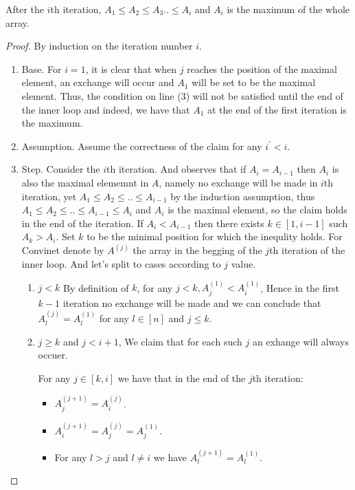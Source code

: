 \begin{claim}
  After the $i$th iteration, $A_{1} \le A_{2} \le A_{3} .. \le A_{i}$ and $A_{i}$ is the maximum of the whole array. 
\end{claim}
\begin{proof}
  By induction on the iteration number $i$. 
  \begin{enumerate}
    \item Base. For $i=1$, it is clear that when $j$ reaches the position of the maximal element, an exchange will occur and $A_{1}$ will be set to be the maximal element. Thus, the condition on line (3) will not be satisfied until the end of the inner loop and indeed, we have that $A_{1}$ at the end of the first iteration is the maximum.
    \item Assumption. Assume the correctness of the claim for any $i^{\prime} < i$. 
    \item Step. Consider the $i$th iteration. And observes that if $A_{i} = A_{i-1}$ then $A_{i}$ is also the maximal elememnt in $A$, namely no exchange will be made in $i$th iteration, yet $A_{1} \le A_{2} \le .. \le A_{i-1}$ by the induction assumption, thus  $A_{1} \le A_{2} \le .. \le A_{i-1} \le A_{i}$ and $A_{i}$ is the maximal element, so the claim holds in the end of the iteration. 
      If $A_{i} < A_{i-1}$ then there exists $k \in [1,i-1]$ such $A_{k} > A_{i}$. Set $k$ to be the minimal position for which the inequlity holds. For Convinet denote by $A^{(j)}$ the array in the begging of the $j$th iteration of the inner loop. And let's split to cases according to $j$ value. 
      \begin{enumerate}
        \item $j < k$ By definition of $k$, for any $j < k, A^{(1)}_{j} < A^{(1)}_{i}$, Hence in the first $k-1$ iteration no exchange will be made and we can conclude that $A^{(j)}_{l} = A^{(1)}_{l}$ for any $l \in [n]$ and $j \le k$. 
        \item $j \ge k$ and $j<i+1$, We claim that for each such $j$ an exhange will always occuer. 
          \begin{claim}
            For any $j \in [k,i]$ we have that in the end of the $j$th iteration:  
            \begin{itemize}
              \item $A^{(j+1)}_{j} = A^{(j)}_{i}$.
              \item $A^{(j+1)}_{i} = A^{(j)}_{j} = A^{(1)}_{j}$.
              \item For any $l > j$ and $l \neq i$ we have $A^{(j+1)}_{l} = A^{(1)}_{l}$.

\end{itemize}
\end{claim}
\end{enumerate}
\end{enumerate}
\end{proof}
